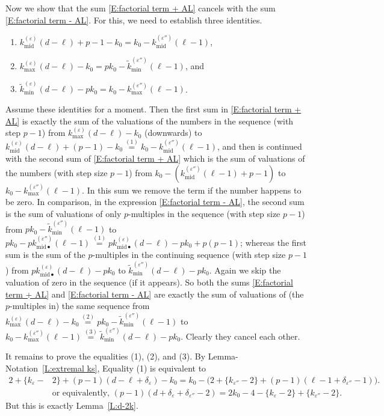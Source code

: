 \documentclass[12pt]{amsart}
\theoremstyle{definition}
\numberwithin{equation}{subsection}
\newcommand{\midd}{\mathrm{mid}}
\begin{document}
\medskip
Now we show that the sum \eqref{E:factorial term + AL} cancels with the sum \eqref{E:factorial term - AL}.
For this, we need to establish three identities.
\begin{enumerate}
\item $k_\midd^{(\varepsilon)} (d-\ell)+p-1 -k_0 =k_0- k_{\midd}^{(\varepsilon'')}(\ell-1)$,
\item 
$k_{\max}^{(\varepsilon)} (d-\ell) -k_0 = pk_0-\tilde  k_{\min}^{(\varepsilon'')}(\ell-1)$, and
\item 
$ \tilde k_{\min}^{(\varepsilon)} (d-\ell) -pk_0=k_0-   k_{\max}^{(\varepsilon'')}(\ell-1) $.
\end{enumerate}
Assume these identities for a moment.
Then the first sum in \eqref{E:factorial term + AL} is exactly the sum of the valuations of the numbers in the sequence (with step $p-1$) from $ k^{(\varepsilon)}_{\max}(d-\ell) - k_0$ (downwards) to $k^{(\varepsilon)}_{\midd}(d-\ell)+(p-1) - k_0 \stackrel{(1)}= k_0 - k_{{\midd}}^{(\varepsilon'')}(\ell-1)$, and then is continued with the second sum of \eqref{E:factorial term + AL} which is the sum of valuations of the numbers (with step size $p-1$) from $k_0 -(k_{{\midd}}^{(\varepsilon'')}(\ell-1)+p-1)$ to $k_0 - k_{\max}^{(\varepsilon'')}(\ell-1)$. In this sum we remove the term if the number happens to be zero.  In comparison, in the expression \eqref{E:factorial term - AL}, the second sum is the sum of valuations of only $p$-multiples in the sequence (with step size $p-1$) from $pk_0-\tilde  k_{\min}^{(\varepsilon'')}(\ell-1)$ to $pk_0 - pk^{(\varepsilon'')}_{\midd \bullet}(\ell-1) 
\stackrel{(1)}=  pk^{(\varepsilon)}_{\midd \bullet}(d-\ell) - pk_0 + p(p-1)$; whereas the first sum is the sum of the $p$-multiples in the continuing sequence (with step size $p-1$) from $
pk^{(\varepsilon)}_{\midd \bullet}(d-\ell) - pk_0$ to $\tilde k^{(\varepsilon'')}_{\min}(d-\ell) - pk_0$. Again we skip the valuation of zero in the sequence (if it appears).
So both the sums \eqref{E:factorial term + AL} and \eqref{E:factorial term - AL} are exactly the sum of valuations of (the $p$-multiples in) the same sequence from $k^{(\varepsilon)}_{\max}(d-\ell) - k_0\stackrel{(2)}= pk_0-\tilde  k_{\min}^{(\varepsilon'')}(\ell-1)$ to $ k_0 - k^{(\varepsilon'')}_{\max}(\ell-1) \stackrel{(3)}=\tilde k^{(\varepsilon'')}_{\min}(d-\ell) - pk_0$. Clearly they cancel each other.

\medskip
It remains to prove the equalities (1), (2), and (3).
By Lemma-Notation~\ref{L:extremal ks}, Equality (1) is equivalent to
\begin{align*}
2+\{k_\varepsilon -&2\} + (p-1)(d-\ell +\delta_\varepsilon) -k_0 = k_0 - \big( 2+\{k_{\varepsilon ''}-2\} + (p-1)(\ell-1 + \delta_{\varepsilon''} -1)\big).
\\
&
\textrm{or equivalently, }(p-1)(d+\delta_\varepsilon + \delta_{\varepsilon''}-2) = 2k_0 -4 -\{k_\varepsilon-2\}+\{k_{\varepsilon''}-2\}.
\end{align*}
But this is exactly Lemma~\ref{L:d-2k}.
\end{document}

